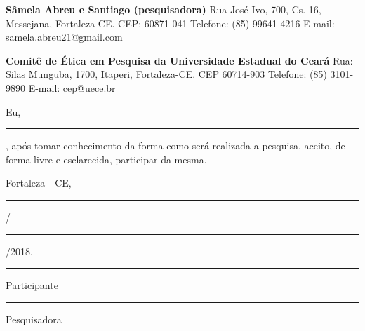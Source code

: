 \bigskip
\bigskip
\noindent
\textbf{Sâmela Abreu e Santiago (pesquisadora)}
Rua José Ivo, 700, Cs. 16, Messejana, Fortaleza-CE. CEP: 60871-041 
Telefone: (85) 99641-4216 E-mail: samela.abreu21@gmail.com 

\bigskip
\bigskip
\noindent
\textbf{Comitê de Ética em Pesquisa da Universidade Estadual do Ceará}
Rua: Silas Munguba, 1700, Itaperi, Fortaleza-CE. CEP 60714-903 
Telefone: (85) 3101-9890 E-mail: cep@uece.br 

\bigskip
\bigskip
\noindent
Eu, \rule[0cm]{5in}{0.1pt}, após tomar conhecimento da forma como será realizada a pesquisa, aceito, de forma livre e esclarecida, participar da mesma.  

\bigskip
\bigskip
\noindent
Fortaleza - CE, \rule[0cm]{0.5in}{0.1pt}/\rule[0cm]{0.5in}{0.1pt}/2018.  

\bigskip
\bigskip
\noindent
\begin{center}
\rule[0cm]{5in}{0.1pt}
\end{center}
\begin{center}
Participante
\end{center}

\bigskip
\bigskip
\noindent
\begin{center}
\rule[0cm]{5in}{0.1pt}
\end{center}
\begin{center}
Pesquisadora
\end{center}

